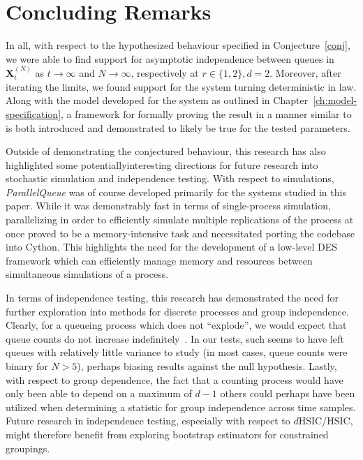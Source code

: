 
\chapter{Concluding Remarks}\label{ch:discussion}

In all, with respect to the hypothesized behaviour specified in Conjecture~\ref{conj}, we were able to find support for asymptotic independence between queues in
$\mathbf{X}^{(N)}_{t}$ as $t\rightarrow \infty$ and $N\rightarrow \infty$, respectively at $r \in \{1,2\}, d = 2$.
Moreover, after iterating the limits, we found support for the system turning deterministic in law.
Along with the model developed for the system as outlined in Chapter~\ref{ch:model-specification}, a framework for formally proving the result in a manner similar to~\cite{bramson_asymptotic_2012}
is both introduced and demonstrated to likely be true for the tested parameters.

Outside of demonstrating the conjectured behaviour, this research has also highlighted some potentiallyinteresting directions
for future research into stochastic simulation and independence testing. 
With respect to simulations, \textit{ParallelQueue} was of course developed primarily for the systems studied in this paper.
While it was demonstrably fast in terms of single-process simulation, parallelizing in order to efficiently simulate multiple replications of the process
at once proved to be a memory-intensive task and necessitated porting the codebase into Cython.
This highlights the need for the development of a low-level DES framework which can efficiently manage memory and resources between simultaneous simulations of a process.

In terms of independence testing, this research has demonstrated the need for further exploration into methods for discrete processes and group independence.
Clearly, for a queueing process which does not ``explode'', we would expect that queue counts do not increase indefinitely~\cite{gardner_redundancy-d_2017}.
In our tests, such seems to have left queues with relatively little variance to study (in most cases, queue counts were binary for $N>5$), perhaps biasing results against the null hypothesis.
Lastly, with respect to group dependence, the fact that a counting process would have only been able to depend on a maximum of $d-1$ others could perhaps have been utilized when determining a statistic for group independence
across time samples.
Future research in independence testing, especially with respect to $d$HSIC/HSIC, might therefore benefit from exploring bootstrap estimators for constrained groupings.

